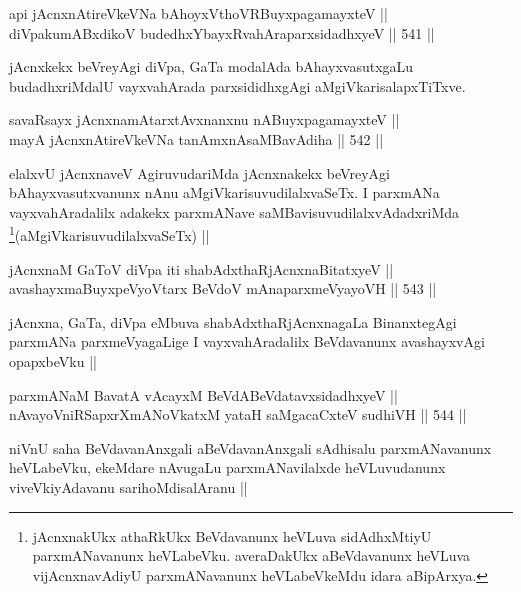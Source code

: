 \begin{shl}
api jAcnxnAtireVkeVNa bAhoyxV\s thoVR\s BuyxpagamayxteV || \\
diVpakumABxdikoV budedhxYbayxRvahAraparxsidadhxyeV ||  541 ||  
\end{shl}

\begin{artha}
jAcnxkekx beVreyAgi diVpa, GaTa modalAda bAhayxvasutxgaLu budadhxriMdalU vayxvahArada parxsididhxgAgi aMgiVkarisalapxTiTxve. 
\end{artha}


\begin{shl}
savaRsayx jAcnxnamAtarxtAvxnanxnu nABuyxpagamayxteV || \\
mayA jAcnxnAtireVkeVNa tanAmxnAsaMBavAdiha ||  542 ||  
\end{shl}

\begin{artha}
elalxvU jAcnxnaveV AgiruvudariMda jAcnxnakekx beVreyAgi bAhayxvasutxvanunx nAnu aMgiVkarisuvudilalxvaSeTx. I parxmANa vayxvahAradalilx adakekx parxmANave saMBavisuvudilalxvAdadxriMda \footnote{jAcnxnakUkx athaRkUkx BeVdavanunx heVLuva sidAdhxMtiyU parxmANavanunx heVLabeVku. averaDakUkx aBeVdavanunx heVLuva vijAcnxnavAdiyU parxmANavanunx heVLabeVkeMdu idara aBipArxya.}(aMgiVkarisuvudilalxvaSeTx) || 
\end{artha}


\begin{shl}
jAcnxnaM GaToV diVpa iti shabAdxthaRjAcnxnaBitatxyeV || \\
avashayxmaBuyxpeVyoV\s tarx BeVdoV mAnaparxmeVyayoVH ||  543 ||  
\end{shl}

\begin{artha}
jAcnxna, GaTa, diVpa eMbuva shabAdxthaRjAcnxnagaLa BinanxtegAgi parxmANa parxmeVyagaLige I vayxvahAradalilx BeVdavanunx avashayxvAgi opapxbeVku ||
\end{artha}

\begin{shl}
parxmANaM BavatA vAcayxM BeVdABeVdatavxsidadhxyeV || \\
nA\s \s vayoVniRSapxrXmANoVkatxM yataH saMgacaCxteV sudhiVH ||  544 ||  
\end{shl}

\begin{artha}
niVnU saha BeVdavanAnxgali aBeVdavanAnxgali sAdhisalu parxmANavanunx heVLabeVku, ekeMdare nAvugaLu parxmANavilalxde heVLuvudanunx viveVkiyAdavanu sarihoMdisalAranu ||
\end{artha}

